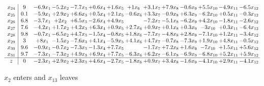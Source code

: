 \documentclass[10pt]{article}
\begin{document}
\[\begin{array}{c| c c@{\hskip 2pt} c@{\hskip 2pt} c@{\hskip 2pt} c@{\hskip 2pt} c@{\hskip 2pt} c@{\hskip 2pt} c@{\hskip 2pt} c@{\hskip 2pt} c@{\hskip 2pt} c@{\hskip 2pt} c@{\hskip 2pt} c@{\hskip 2pt} }
 x_{24}   &  9 & -6.9 x_{1} & -5.2 x_{2} & -7.7 x_{3} & + 0.6 x_{4} & + 1.6 x_{5} & + 1  x_{6} & + 3.1 x_{7} & + 7.9 x_{8} & -0.6 x_{9} & + 5.5 x_{10} & -4.9 x_{11} & -6.5 x_{12}\\
 x_{25}   &  0.1 & -5.9 x_{1} & + 2.9 x_{2} & + 6.6 x_{3} & + 0.5 x_{4} & + 2.1 x_{5} & -0.6 x_{6} & + 3.3 x_{7} & -0.9 x_{8} & + 6.3 x_{9} & -6.2 x_{10} & + 0.5 x_{11} & -0.3 x_{12}\\
 x_{26}   &  6.8 & -3.7 x_{1} & + 2  x_{2} & + 6.5 x_{3} & -2.6 x_{4} & + 4.9 x_{5} &   & -7.2 x_{7} & -5.1 x_{8} & -6.2 x_{9} & + 4.2 x_{10} & -1.8 x_{11} & -2.6 x_{12}\\
 x_{27}   &  7.6 & -4.2 x_{1} & + 1.7 x_{2} & + 4.2 x_{3} & + 6.3 x_{4} & + 0.9 x_{5} & + 2.7 x_{6} & + 0.9 x_{7} & + 0.1 x_{8} & + 0.3 x_{9} & -3  x_{10} & + 0.3 x_{11} & -6.4 x_{12}\\
 x_{28}   &  9.8 & -0.7 x_{1} & -6.5 x_{2} & + 4.7 x_{3} & -1.5 x_{4} & -0.8 x_{5} & + 1.8 x_{6} & -7.7 x_{7} & -4.8 x_{8} & + 2.8 x_{9} & -7.1 x_{10} & + 1.2 x_{11} & -3.4 x_{12}\\
 x_{29}   &  3 & + 8  x_{1} & -1.5 x_{2} & -7.6 x_{3} & + 4.1 x_{4} & -5.9 x_{5} & + 4.1 x_{6} & + 4.7 x_{7} & -0.7 x_{8} & -7.3 x_{9} & + 1.9 x_{10} & + 4.8 x_{11} & -0.5 x_{12}\\
 x_{30}   &  9.6 & -0.9 x_{1} & -0.7 x_{2} & -7.3 x_{3} & -1.3 x_{4} & + 7.7 x_{5} &   & -1.7 x_{7} & + 7.2 x_{8} & + 1.6 x_{9} & -7  x_{10} & + 1.5 x_{11} & + 5.6 x_{12}\\
 x_{31}   &  9.7 & -7.3 x_{1} & -7.3 x_{2} & + 4.9 x_{3} & + 6.9 x_{4} & + 7.7 x_{5} & -6.3 x_{6} & + 6.2 x_{7} & -6.1 x_{8} & -6.9 x_{9} & -6.8 x_{10} & + 5.2 x_{11} & + 5.9 x_{12}\\
\hline
z    &  0 & -2.3 x_{1} & + 2.9 x_{2} & + 2.3 x_{3} & + 4.6 x_{4} & -2.7 x_{5} & -1.8 x_{6} & + 0.9 x_{7} & + 3.4 x_{8} & -1.6 x_{9} & -4.1 x_{10} & + 2.9 x_{11} & -4.1 x_{12}\\
\end{array}\]


 $ x_{2} $ enters and $ x_{13} $ leaves 
\end{document}
